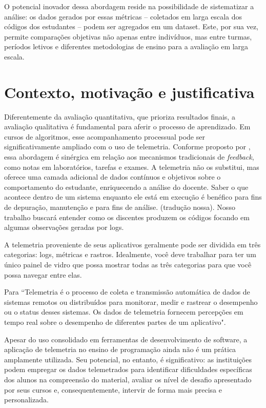 O potencial inovador dessa abordagem reside na possibilidade de sistematizar a análise: os dados gerados por 
essas métricas -- coletados em larga escala dos códigos dos estudantes -- podem ser agregados em um dataset. 
Este, por sua vez, permite comparações objetivas não apenas entre indivíduos, mas entre turmas, períodos 
letivos e diferentes metodologias de ensino para a avaliação em larga escala. 


\section{Contexto, motivação e justificativa}\label{sec:consideracoesIniciais}

Diferentemente da avaliação quantitativa, que prioriza resultados 
finais, a avaliação qualitativa é fundamental para aferir o processo de 
aprendizado. Em cursos de algoritmos, esse acompanhamento processual 
pode ser significativamente ampliado com o uso de telemetria.  Conforme 
proposto por \cite{russo2015towards}, essa abordagem é sinérgica em 
relação aos mecanismos tradicionais de \textit{feedback}, como notas em 
laboratórios, tarefas e exames. A telemetria não os substitui, mas 
oferece uma camada adicional de dados contínuos e objetivos sobre o 
comportamento do estudante, enriquecendo a análise do docente.
Saber o que acontece dentro de um sistema enquanto ele está em execução 
é benéfico para fins de depuração, manutenção e para fins de 
análise.\cite{Gatev2021} (tradução nossa). Nosso trabalho buscará 
entender como os discentes produzem os códigos focando em algumas 
observações geradas por logs.

A telemetria proveniente de seus aplicativos geralmente pode ser dividida em três categorias: logs, métricas e rastros. Idealmente, você deve trabalhar para ter um único painel de vidro que possa mostrar todas as três categorias para que você possa navegar entre elas. \cite{Gatev2021}

Para \cite{theLinuxFoundation-2024}``Telemetria é o processo de coleta 
e transmissão automática de dados de sistemas remotos ou distribuídos 
para monitorar, medir e rastrear o desempenho ou o status desses 
sistemas. Os dados de telemetria fornecem percepções em tempo real 
sobre o desempenho de diferentes partes de um aplicativo". 

Apesar do uso consolidado em ferramentas de desenvolvimento de 
software, a aplicação de telemetria no ensino de programação ainda não 
é um prática amplamente utilizada. Seu potencial, no entanto, é 
significativo: as instituições podem empregar os dados telemetrados 
para identificar dificuldades específicas dos alunos na compreensão do 
material, avaliar os nível de desafio apresentado por seus cursos e, 
consequentemente, intervir de forma mais precisa e personalizada.


